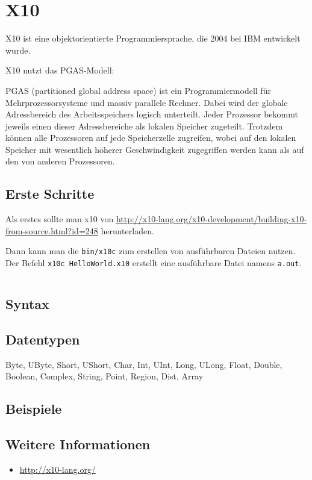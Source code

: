 \chapter{X10}%
X10 ist eine objektorientierte Programmiersprache, die 2004 bei IBM entwickelt
wurde.

X10 nutzt das PGAS-Modell:

\begin{definition}%
    PGAS (partitioned global address space) ist ein Programmiermodell für 
    Mehrprozessorsysteme und massiv parallele Rechner. Dabei wird der globale 
    Adressbereich des Arbeitsspeichers logisch unterteilt. Jeder Prozessor 
    bekommt jeweils einen dieser Adressbereiche als lokalen Speicher zugeteilt. 
    Trotzdem können alle Prozessoren auf jede Speicherzelle zugreifen, wobei auf 
    den lokalen Speicher mit wesentlich höherer Geschwindigkeit zugegriffen 
    werden kann als auf den von anderen Prozessoren.
\end{definition}

\section{Erste Schritte}
Als erstes sollte man x10 von \url{http://x10-lang.org/x10-development/building-x10-from-source.html?id=248} herunterladen.

Dann kann man die \texttt{bin/x10c} zum erstellen von ausführbaren Dateien nutzen.
Der Befehl \texttt{x10c HelloWorld.x10} erstellt eine ausführbare Datei namens
\texttt{a.out}.

\inputminted[numbersep=5pt, tabsize=4, frame=lines, label=HelloWorld.x10]{cpp}{scripts/x10/HelloWorld.x10}

\section{Syntax}
\section{Datentypen}
Byte, UByte, Short, UShort, Char, Int, UInt, Long, ULong, Float, Double, Boolean, Complex, String, Point, Region, Dist, Array

\section{Beispiele}

\section{Weitere Informationen}
\begin{itemize}
    \item \url{http://x10-lang.org/}
\end{itemize}
